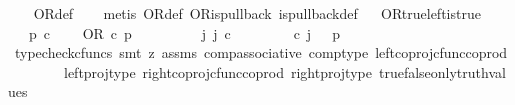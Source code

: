 \begin{isabellebody}
%
\isadelimproof
\ \ %
\endisadelimproof
%
\isatagproof
{}\isamarkupfalse%
\ OR{\isacharunderscore}{\kern0pt}def\isanewline
\ \ \isamarkupfalse%
\ {\isacharparenleft}{\kern0pt}metis\ OR{\isacharunderscore}{\kern0pt}def\ OR{\isacharunderscore}{\kern0pt}is{\isacharunderscore}{\kern0pt}pullback\ is{\isacharunderscore}{\kern0pt}pullback{\isacharunderscore}{\kern0pt}def{\isacharparenright}{\kern0pt}%
\endisatagproof
{\isafoldproof}%
%
\isadelimproof
\ \isanewline
%
\endisadelimproof
\isanewline
{}\isamarkupfalse%
\ OR{\isacharunderscore}{\kern0pt}true{\isacharunderscore}{\kern0pt}left{\isacharunderscore}{\kern0pt}is{\isacharunderscore}{\kern0pt}true{\isacharcolon}{\kern0pt}\isanewline
\ \ \ {\isachardoublequoteopen}p\ {\isasymin}\isactrlsub c\ {\isasymOmega}{\isachardoublequoteclose}\isanewline
\ \ \ {\isachardoublequoteopen}OR\ {\isasymcirc}\isactrlsub c\ {\isasymlangle}{\isasymt}{\isacharcomma}{\kern0pt}p{\isasymrangle}\ {\isacharequal}{\kern0pt}\ {\isasymt}{\isachardoublequoteclose}\isanewline
%
\isadelimproof
%
\endisadelimproof
%
\isatagproof
{}\isamarkupfalse%
\ {\isacharminus}{\kern0pt}\ \isanewline
\ \ \isamarkupfalse%
\ {\isachardoublequoteopen}{\isasymexists}\ j{\isachardot}{\kern0pt}\ j\ {\isasymin}\isactrlsub c\ {\isasymone}{\isasymCoprod}{\isacharparenleft}{\kern0pt}{\isasymone}{\isasymCoprod}{\isasymone}{\isacharparenright}{\kern0pt}\ {\isasymand}\ {\isacharparenleft}{\kern0pt}{\isasymlangle}{\isasymt}{\isacharcomma}{\kern0pt}\ {\isasymt}{\isasymrangle}{\isasymamalg}\ {\isacharparenleft}{\kern0pt}{\isasymlangle}{\isasymt}{\isacharcomma}{\kern0pt}\ {\isasymf}{\isasymrangle}\ {\isasymamalg}{\isasymlangle}{\isasymf}{\isacharcomma}{\kern0pt}\ {\isasymt}{\isasymrangle}{\isacharparenright}{\kern0pt}{\isacharparenright}{\kern0pt}\ {\isasymcirc}\isactrlsub c\ j\ \ {\isacharequal}{\kern0pt}\ {\isasymlangle}{\isasymt}{\isacharcomma}{\kern0pt}p{\isasymrangle}{\isachardoublequoteclose}\isanewline
\ \ \ \ \isamarkupfalse%
\ {\isacharparenleft}{\kern0pt}typecheck{\isacharunderscore}{\kern0pt}cfuncs{\isacharcomma}{\kern0pt}\ smt\ {\isacharparenleft}{\kern0pt}z{}{\isacharparenright}{\kern0pt}\ assms\ comp{\isacharunderscore}{\kern0pt}associative{}\ comp{\isacharunderscore}{\kern0pt}type\ left{\isacharunderscore}{\kern0pt}coproj{\isacharunderscore}{\kern0pt}cfunc{\isacharunderscore}{\kern0pt}coprod\isanewline
\ \ \ \ \ \ \ \ left{\isacharunderscore}{\kern0pt}proj{\isacharunderscore}{\kern0pt}type\ right{\isacharunderscore}{\kern0pt}coproj{\isacharunderscore}{\kern0pt}cfunc{\isacharunderscore}{\kern0pt}coprod\ right{\isacharunderscore}{\kern0pt}proj{\isacharunderscore}{\kern0pt}type\ true{\isacharunderscore}{\kern0pt}false{\isacharunderscore}{\kern0pt}only{\isacharunderscore}{\kern0pt}truth{\isacharunderscore}{\kern0pt}values{\isacharparenright}{\kern0pt}\isanewline

\end{isabellebody}
